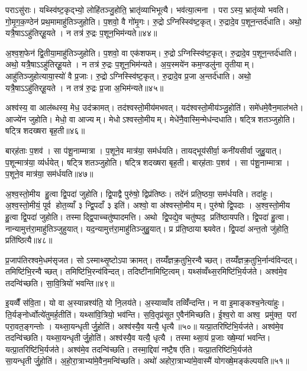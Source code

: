 पराऽसु॑राः। यथ्स्वि॑ष्ट॒कृद्भ्यो॒ लोहि॑तञ्जु॒होति॒ भ्रातृ॑व्याभिभूत्यै। भव॑त्या॒त्मना। पराऽस्य॒ भ्रातृ॑व्यो भवति। गो॒मृ॒ग॒क॒ण्ठेन॑ प्रथ॒मामाहु॑तिञ्जुहोति। प॒शवो॒ वै गो॑मृ॒गः। रु॒द्रोऽग्निस्स्वि॑ष्ट॒कृत्। रु॒द्रादे॒व प॒शून॒न्तर्द॑धाति। अथो॒ यत्रै॒षाऽऽहु॑तिर्‌हू॒यते। न तत्र॑ रु॒द्रः प॒शून॒भिम॑न्यते॥४४॥

अ॒श्व॒श॒फेन॑ द्वि॒तीया॒माहु॑तिञ्जुहोति। प॒शवो॒ वा एक॑शफम्। रु॒द्रोऽग्निस्स्वि॑ष्ट॒कृत्। रु॒द्रादे॒व प॒शून॒न्तर्द॑धाति। अथो॒ यत्रै॒षाऽऽहु॑तिर्‌हू॒यते। न तत्र॑ रु॒द्रः प॒शून॒भिम॑न्यते। अ॒य॒स्मये॑न कम॒ण्डलु॑ना तृ॒तीयाम्। आहु॑तिञ्जुहोत्याया॒स्यो॑ वै प्र॒जाः। रु॒द्रोऽग्निस्स्वि॑ष्ट॒कृत्। रु॒द्रादे॒व प्र॒जा अ॒न्तर्द॑धाति। अथो॒ यत्रै॒षाऽऽहु॑तिर्‌हू॒यते। न तत्र॑ रु॒द्रः प्र॒जा अ॒भिम॑न्यते॥४५॥\anuvakamend[द॒धा॒त्यभ॑वन्मन्यते प्र॒जा अ॒न्तर्द॑धाति॒ द्वे च॑ ]

अश्व॑स्य॒ वा आल॑ब्धस्य॒ मेध॒ उद॑क्रामत्। तद॑श्वस्तो॒मीय॑मभवत्। यद॑श्वस्तो॒मीय॑ञ्जु॒होति॑। समे॑धमे॒वैन॒माल॑भते। आज्ये॑न जुहोति। मेधो॒ वा आज्यम्। मेधोऽश्वस्तो॒मीयम्। मेधे॑नै॒वास्मि॒न्मेध॑न्दधाति। षट्त्रिशतञ्जुहोति। षट्त्रिशदख्षरा बृह॒ती॥४६॥

बार्‌ह॑ताः प॒शव॑। सा प॑शू॒नाम्मात्रा। प॒शूने॒व मात्र॑या॒ सम॑र्धयति। तायद्भूय॑सीर्वा॒ कनी॑यसीर्वा जुहु॒यात्। प॒शून्मात्र॑या॒ व्य॑र्धयेत्। षट्त्रिशतञ्जुहोति। षट्त्रिशदख्षरा बृह॒ती। बार्‌ह॑ताः प॒शव॑। सा प॑शू॒नाम्मात्रा। प॒शूने॒व मात्र॑या॒ सम॑र्धयति॥४७॥

अ॒श्व॒स्तो॒मीय हु॒त्वा द्वि॒पदा॑ जुहोति। द्वि॒पाद्वै पुरु॑षो॒ द्विप्र॑तिष्ठः। तदे॑नं प्रति॒ष्ठया॒ सम॑र्धयति। तदा॑हुः। अ॒श्व॒स्तो॒मीयं॒ पूर्व होत॒व्याँ ३ न्द्वि॒पदाँ ३ इति॑। अश्वो॒ वा अ॑श्वस्तो॒मीयम्। पुरु॑षो द्वि॒पदाः। अ॒श्व॒स्तो॒मीय हु॒त्वा द्वि॒पदा॑ जुहोति। तस्माद्द्वि॒पाच्चतु॑ष्पादमत्ति। अथो द्वि॒पद्ये॒व चतु॑ष्पद॒ प्रति॑ष्ठायपति। द्वि॒पदा॑ हु॒त्वा। नान्यामुत्त॑रा॒माहु॑तिञ्जुहुयात्। यद॒न्यामुत्त॑रा॒माहु॑तिञ्जुहु॒यात्। प्र प्र॑ति॒ष्ठायाश्च्यवेत। द्वि॒पदा॑ अन्त॒तो जु॑होति॒ प्रति॑ष्ठित्यै॥४८॥

प्र॒जाप॑तिरश्वमे॒धम॑सृजत। सोऽस्माथ्सृ॒ष्टोऽपाक्रामत्। तय्यँ॑ज्ञक्र॒तुभि॒रन्वैच्छत्। तय्यँ॑ज्ञक्र॒तुभि॒र्नान्व॑विन्दत्। तमिष्टि॑भि॒रन्वैच्छत्। तमिष्टि॑भि॒रन्व॑विन्दत्। तदिष्टी॑नामिष्टि॒त्वम्। यथ्स॑व्वँथ्स॒रमिष्टि॑भि॒र्यज॑ते। अश्व॑मे॒व तदन्वि॑च्छति। सा॒वि॒त्रियो॑ भवन्ति॥४९॥

इ॒यव्वैँ स॑वि॒ता। यो वा अ॒स्यान्नश्य॑ति॒ यो नि॒लय॑ते। अ॒स्याव्वाँव तव्विँ॑न्दन्ति। न वा इ॒माङ्कश्च॒नेत्या॑हुः। ति॒र्यङ्नोर्ध्वोत्ये॑तुमर्ह॒तीति॑। यथ्सा॑वि॒त्रियो॒ भव॑न्ति। स॒वि॒तृप्र॑सूत ए॒वैन॑मिच्छति। ई॒श्व॒रो वा अश्व॒ प्रमु॑क्त॒ परां परा॒वत॒ङ्गन्तोः। यथ्सा॒यन्धृतीर्जु॒होति॑। अश्व॑स्यै॒व यत्यै॒ धृत्यै॥५०॥ यत्प्रा॒तरिष्टि॑भि॒र्यज॑ते। अश्व॑मे॒व तदन्वि॑च्छति। यथ्सा॒यन्धृतीर्जु॒होति॑। अश्व॑स्यै॒व यत्यै॒ धृत्यै। तस्माथ्सा॒यं प्र॒जाः ख्षे॒म्या॑ भवन्ति। यत्प्रा॒तरिष्टि॑भि॒र्यज॑ते। अश्व॑मे॒व तदन्वि॑च्छति। तस्मा॒द्दिवा॑ नष्टै॒ष ए॑ति। यत्प्रा॒तरिष्टि॑भि॒र्यज॑ते सा॒यन्धृतीर्जु॒होति॑। अ॒हो॒रा॒त्राभ्या॑मे॒वैन॒मन्वि॑च्छति। अथो॑ अहोरा॒त्राभ्या॑मे॒वास्मै॑ योगख्षे॒मङ्क॑ल्पयति॥५१॥\anuvakamend[भ॒व॒न्ति॒ धृत्या॑ एन॒मन्वि॑च्छ॒त्येक॑ञ्च]

